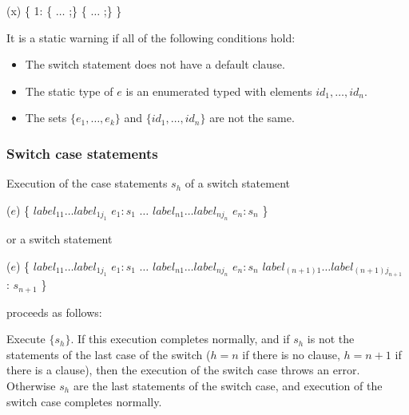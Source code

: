 \documentclass{article}
\begin{document}
\begin{dartCode}
\SWITCH{} (x) \{
  \CASE{} 1: \TRY{} \{ $\ldots$ \RETURN{};\} \FINALLY{} \{ $\ldots$ \RETURN{};\}
\}
\end{dartCode}


\LMHash{}
 It is a static warning if all of the following conditions hold:
 \begin{itemize}
\item  The switch statement does not have a default clause.
 \item The static type of $e$ is an enumerated typed with elements $id_1, \ldots, id_n$.
\item The sets $\{e_1, \ldots,  e_k\} $ and $\{id_1, \ldots, id_n\}$ are not the same.
\end{itemize}


\LMHash{}
\subsubsection{Switch case statements}

\LMHash{}
Execution of the case statements $s_h$ of a switch statement

\begin{dartCode}
\SWITCH{} ($e$) \{
   $label_{11} \ldots label_{1j_1}$ \CASE{} $e_1: s_1$
   $\ldots$
   $label_{n1} \ldots label_{nj_n}$ \CASE{} $e_n: s_n$
\}
\end{dartCode}

or a switch statement

\begin{dartCode}
\SWITCH{} ($e$) \{
   $label_{11} \ldots label_{1j_1}$ \CASE{} $e_1: s_1$
   $\ldots$
   $label_{n1} \ldots label_{nj_n}$ \CASE{} $e_n: s_n$
   $label_{(n+1)1} \ldots label_{(n+1)j_{n+1}}$ \DEFAULT{}: $s_{n+1}$
\}
\end{dartCode}

proceeds as follows:

\LMHash{}
Execute $\{s_h\}$.
If this execution completes normally,
and if $s_h$ is not the statements of the last case of the switch
($h = n$ if there is no \DEFAULT{} clause,
$h = n+1$ if there is a \DEFAULT{} clause),
then the execution of the switch case throws an error.
Otherwise $s_h$ are the last statements of the switch case,
and execution of the switch case completes normally.
\end{document}
